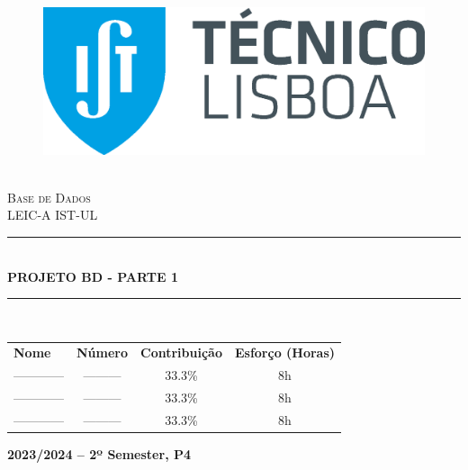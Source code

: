 \documentclass{article}
\newcommand{\HRule}[1]{\rule{\linewidth}{#1}}
\begin{document}
\begin{center}
    \begin{figure}
        \includegraphics[scale = 0.3, left]{img/IST_A.eps} %
        \end{figure}
    \LARGE{ \normalsize \textsc{} \\
    [2.0cm] 
    \LARGE{ \Huge \textsc{Base de Dados}} \\
    [1cm]
    \LARGE{ \LARGE \textsc{LEIC-A IST-UL}} \\
    [1cm]
    \HRule{1.5pt} \\
    [0.4cm]
    \LARGE \textbf{\uppercase{Projeto BD - Parte 1}}
    \HRule{1.5pt}
    \\ [2.5cm]
    }
\end{center}

\vspace{0.5cm}
\begin{center}
\begin{tabular}{ l c c c}
\textbf{Nome} & \textbf{Número} & \textbf{Contribuição} & \textbf{Esforço (Horas)} \\
 ------------ & --------- & 33.3\% & 8h \\
 ------------ & ---------  & 33.3\% & 8h \\
 ------------ & --------- & 33.3\% & 8h
\end{tabular}
\end{center}

\begin{center}
    \vspace{3.5cm}
    \date \large \bf  2023/2024 -- 2º Semester, P4
\end{center}


\setcounter{page}{0}
\thispagestyle{empty}
\end{document}
